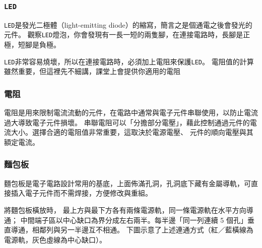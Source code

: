 \documentclass[12pt,a4paper]{article}
\begin{document}
\subsubsection{\texttt{LED}}

\texttt{LED}是發光二極體（light-emitting diode）的縮寫，簡言之是個通電之後會發光的元件。
觀察\texttt{LED}燈泡，你會發現有一長一短的兩隻腳，在連接電路時，長腳是正極，短腳是負極。

\texttt{LED}非常容易燒壞，所以在連接電路時，必須加上電阻來保護\texttt{LED}。
電阻值的計算雖然重要，但這裡先不細講，課堂上會提供你適用的電阻

\subsubsection{電阻}
電阻是用來限制電流流動的元件，在電路中通常與電子元件串聯使用，以防止電流過大導致電子元件損壞。
串聯電阻可以「分擔部分電壓」，藉此控制通過元件的電流大小。選擇合適的電阻值非常重要，這取決於電源電壓、
元件的順向電壓與其額定電流。


\subsubsection{麵包板}

麵包板是電子電路設計常用的基底，上面佈滿孔洞，孔洞底下藏有金屬導軌，可直接插入電子元件而不需焊接，方便修改與重組。

將麵包板橫放時，
最上方與最下方各有兩條電源軌，同一條電源軌在水平方向導通；
中間端子區以中心缺口為界分成左右兩半。每半邊「同一列連續 5 個孔」垂直導通，相鄰列與另一半邊互不相通。
下圖示意了上述連通方式（紅／藍橫線為電源軌，灰色虛線為中心缺口）。
\end{document}
